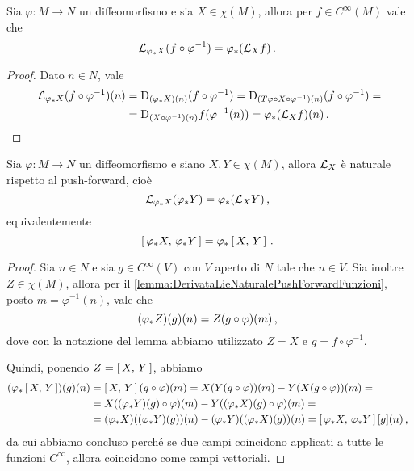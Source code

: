 \begin{lemma}\label{lemma:DerivataLieNaturalePushForwardFunzioni}
	Sia $\varphi:M\to N$ un diffeomorfismo e sia $X\in\chi(M)$, allora per $f\in C^\infty(M)$ vale che
	\begin{equation*}
		\mathcal L_{\varphi_*X}(f\circ \varphi^{-1})=\varphi_*(\mathcal L_Xf)\, \text{. }
	\end{equation*}
\end{lemma}

\begin{proof}
	Dato $n\in N$, vale
	\begin{align*} %
		\Lie_{\varphi_*X}(f\circ \varphi^{-1})(n)&=\Diff_{(\varphi_*X)(n)}(f\circ \varphi^{-1})=\Diff_{(T\varphi \circ X \circ\varphi^{-1})(n)}(f\circ \varphi^{-1})=\\
		&=\Diff_{(X\circ \varphi^{-1})(n)} f(\varphi^{-1}(n))=\varphi_*(\Lie_Xf)(n)\punto
	\end{align*}
\end{proof}


\begin{proposition}\label{prop:DerivataLieNaturalePushForwardCampiVett}
	Sia $\varphi:M\to N$ un diffeomorfismo e siano $X,Y\in\chi(M)$, allora $\mathcal L_X$ è naturale rispetto al push-forward, cioè
	\begin{equation*}
		\mathcal L_{\varphi_*X}(\varphi_*Y)=\varphi_*(\mathcal L_XY)\, \text{, }
	\end{equation*}
	equivalentemente
	\begin{equation*}
		\left[\,\varphi_*X,\,\varphi_*Y\,\right]=\varphi_*\left[\,X,\,Y\,\right]\, \text{. }
	\end{equation*}
\end{proposition}

\begin{proof}
	Sia $n\in N$ e sia $g\in C^\infty(V)$ con $V$ aperto di $N$ tale che $n\in V$. Sia inoltre $Z\in\chi(M)$, allora per il \cref{lemma:DerivataLieNaturalePushForwardFunzioni}, posto $m=\varphi^{-1}(n)$, vale che
	\begin{equation*}
		(\varphi_*Z)(g)(n)=Z(g\circ \varphi)(m)\, \text{, }
	\end{equation*}
	dove con la notazione del lemma abbiamo utilizzato $Z=X$ e $g=f\circ \varphi^{-1}$.
	
	Quindi, ponendo $Z=\left[\,X,\,Y\,\right]$, abbiamo
	\begin{align*}
	(\varphi_*\left[\,X,\,Y\,\right])(g)(n)&=\left[\,X,\,Y\,\right](g\circ \varphi)(m)=X(Y(g\circ \varphi))(m)-Y(X(g\circ \varphi))(m)=\\
	&=X((\varphi_*Y)(g)\circ \varphi)(m)-Y((\varphi_*X)(g)\circ \varphi)(m) =\\
	&= (\varphi_*X)((\varphi_*Y)(g))(n)-(\varphi_*Y)((\varphi_*X)(g))(n) = \left[\,\varphi_* X,\,\varphi_* Y\,\right][g](n)\, \text{, }
	\end{align*}
	da cui abbiamo concluso perché se due campi coincidono applicati a tutte le funzioni $C^\infty$, allora coincidono come campi vettoriali.
\end{proof}

